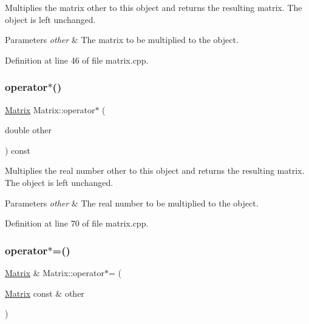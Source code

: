Multiplies the matrix {\ttfamily other} to this object and returns the resulting matrix. The object is left unchanged.


\begin{DoxyParams}{Parameters}
{\em other} & The matrix to be multiplied to the object. \\
\hline
\end{DoxyParams}


Definition at line 46 of file matrix.\+cpp.

\mbox{\label{classMatrix_afdd6cdea30961d5ce34be67332c1d0dd}} 
\subsubsection{\texorpdfstring{operator$\ast$()}{operator*()}\hspace{0.1cm}{\footnotesize\ttfamily [2/2]}}
{\footnotesize\ttfamily \hyperlink{classMatrix}{Matrix} Matrix\+::operator$\ast$ (\begin{DoxyParamCaption}\item[{double}]{other }\end{DoxyParamCaption}) const}

Multiplies the real number {\ttfamily other} to this object and returns the resulting matrix. The object is left unchanged.


\begin{DoxyParams}{Parameters}
{\em other} & The real number to be multiplied to the object. \\
\hline
\end{DoxyParams}


Definition at line 70 of file matrix.\+cpp.

\mbox{\label{classMatrix_a8d3c514ae15700397053fd3402552b1c}} 
\subsubsection{\texorpdfstring{operator$\ast$=()}{operator*=()}\hspace{0.1cm}{\footnotesize\ttfamily [1/2]}}
{\footnotesize\ttfamily \hyperlink{classMatrix}{Matrix} \& Matrix\+::operator$\ast$= (\begin{DoxyParamCaption}\item[{\hyperlink{classMatrix}{Matrix} const \&}]{other }\end{DoxyParamCaption})}

